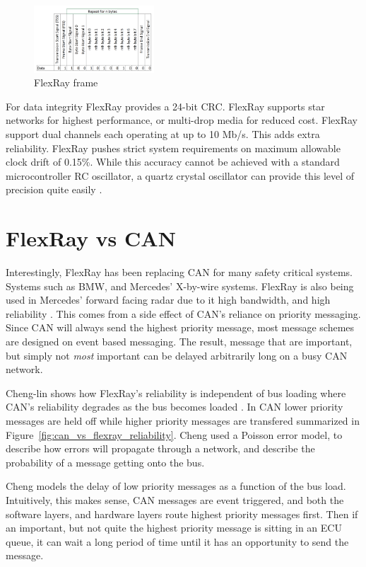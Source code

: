 \documentclass[conference,12pt]{IEEEtran}
\begin{document}
\begin{figure}
  \centering
  \includegraphics[width=0.4\textwidth]{Flexray.PNG}
  \caption{FlexRay frame}
  \label{fig:flexray_frame}
\end{figure}

For data integrity FlexRay provides a 24-bit CRC. FlexRay supports star
networks for highest performance, or multi-drop media for reduced cost. FlexRay
support dual channels each operating at up to 10 Mb/s. This adds extra
reliability. FlexRay pushes strict system requirements on maximum allowable clock
drift of 0.15\%. While this accuracy cannot be achieved with a standard
microcontroller RC oscillator, a quartz crystal oscillator can provide this
level of precision quite easily \autocite{_crystal_2014}. 

\section{FlexRay vs CAN}
Interestingly, FlexRay has been replacing CAN for many safety critical
systems. Systems such as BMW, and Mercedes' X-by-wire systems. FlexRay is also
being used in Mercedes' forward facing radar due to it high bandwidth, and high
reliability \autocite{guo_secure_2009}.  This comes from a side effect of CAN's
reliance on priority messaging.  Since CAN will always send the highest
priority message, most message schemes are designed on event based messaging.
The result, message that are important, but simply not \emph{most} important can
be delayed arbitrarily long on a busy CAN network. 

Cheng-lin shows how
FlexRay's reliability is independent of bus loading where CAN's reliability
degrades as the bus becomes loaded \autocite{cheng-lin_real-time_2010}.  In CAN
lower priority messages are held off while higher priority messages are
transfered summarized in Figure~\ref{fig:can_vs_flexray_reliability}. Cheng used
a Poisson error model, to describe how errors will propagate through a network,
and describe the probability of a message getting onto the bus. 

Cheng models the delay of low priority messages as
a function of the bus load. Intuitively, this makes sense, CAN messages are event
triggered, and both the software layers, and hardware layers route highest
priority messages first. Then if an important, but not quite the highest
priority
message is sitting in an ECU queue, it can wait a long period of time until it
has an opportunity to send the message.
\end{document}
